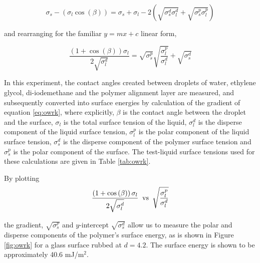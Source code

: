 \begin{equation}
\sigma_s-\left(\sigma_l\cos{\left(\beta\right)}\right)=\sigma_s+\sigma_l-2\left(\sqrt{\sigma_s^d\sigma_l^d}+\sqrt{\sigma_s^p\sigma_l^p}\right)
\end{equation}

\noindent and rearranging  for the familiar $y=mx+c$ linear form,

\begin{equation}
\frac{\left(1+\cos{\left(\beta\right)}\right)\sigma_l}{2\sqrt{\sigma_l^d}}=\sqrt{\sigma_s^p}\sqrt{\frac{\sigma_l^p}{\sigma_l^d}}+\sqrt{\sigma_s^d}
\label{eq:owrk}
\end{equation}

In this experiment, the contact angles created between droplets of water, ethylene glycol, di-iodemethane and the polymer alignment layer are measured, and subsequently converted into surface energies by calculation of the gradient of equation \ref{eq:owrk}, where explicitly, $\beta$ is the contact angle between the droplet and the surface, $\sigma_l$ is the total surface tension of the liquid, $\sigma_l^d$ is the disperse component of the liquid surface tension, $\sigma_l^p$ is the polar component of the liquid surface tension, $\sigma_s^d$ is the disperse component of the polymer surface tension and $\sigma_s^p$ is the polar component of the surface. The test-liquid surface tensions used for these calculations are given in Table \ref{tab:owrk}.

By plotting
\begin{equation}
\frac{\left(1+\cos\left(\beta\right)\right)\sigma_l}{2\sqrt{\sigma_l^d}} \text{\hspace{0.7mm} vs \hspace{0.7mm}} \sqrt{\frac{\sigma_l^p}{\sigma_l^d}}
\end{equation}

the gradient, $\sqrt{\sigma_s^p}$ and $y$-intercept $\sqrt{\sigma_s^d}$ allow us to measure the polar and disperse components of the polymer's surface energy, as is shown in Figure \ref{fig:owrk} for a glass surface rubbed at $d=4.2$. The surface energy is shown to be approximately 40.6 mJ/m$^2$.

